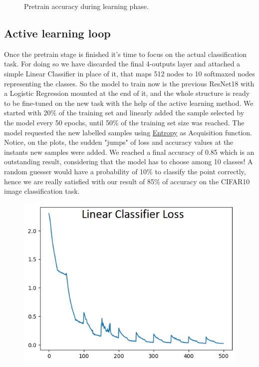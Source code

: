 \documentclass{article}
\begin{document}
\begin{flushleft}
\begin{figure}[h]
    \caption{ Pretrain accuracy during learning phase.}
\end{figure}
\subsection{Active learning loop}
Once the pretrain stage is finished it's time to focus on the actual classification task.
 For doing so we have discarded the final 4-outputs layer and attached a simple Linear Classifier in place of it, 
that maps 512 nodes to 10 softmaxed nodes representing the classes.
So the model to train now is the previous ResNet18 with a Logistic Regression mounted at the end of it, and the whole structure is 
ready to be fine-tuned on the new task with the help of the active learning method.
We started with 20\% of the training set and linearly added the sample selected by the model every 50 epochs, until 50\% of the training set size was reached. The model requested the new labelled samples
using \hyperref[sec:entropy]{Entropy} as Acquisition function. Notice, on the plots, the sudden "jumps" of loss and accuracy values at the instants new samples were added.
We reached a final accuracy of 0.85 which is an outstanding result, considering that the model has to choose among 10 classes!
A random guesser would have a probability of 10\% to classify the point correctly, hence we are really satisfied with our result of 85\% of accuracy on the CIFAR10 image classification task.
\begin{figure}[h]
    \centering
    \includegraphics[scale=1.25]{lcsl_500_20_50_loss}

\end{figure}
\end{flushleft}
\end{document}
